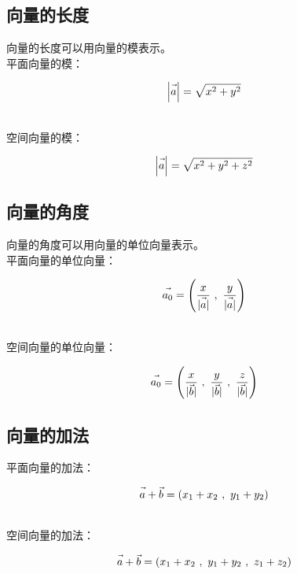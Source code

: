 \documentclass[UTF8]{ctexart}
\let\nvec\vec
\def\vec#1{\nvec{\vphantom b\smash{#1}}}
\begin{document}
\newpage

\subsection{向量的长度}
    向量的长度可以用向量的模表示。\\[3mm]
    平面向量的模：
    \begin{large}
        \begin{equation*}
            \left|\vec{a}\right|=\sqrt{x^2+y^2}    
        \end{equation*}
    \end{large}\\
    空间向量的模：
    \begin{large}
        \begin{equation*}
            \left|\vec{a}\right|=\sqrt{x^2+y^2+z^2}
        \end{equation*}
    \end{large}\vspace{-10pt}

\subsection{向量的角度}
    向量的角度可以用向量的单位向量表示。\\[3mm]
    平面向量的单位向量：
    \begin{large}
        \begin{equation*}
            \vec{a_0}=\left(\frac{x}{|\vec{a}|}~,~\frac{y}{|\vec{a}|}\right)
        \end{equation*}
    \end{large}\\
    空间向量的单位向量：
    \begin{large}
        \begin{equation*}
            \vec{a_0}=\left(\frac{x}{|\vec{b}|}~,~\frac{y}{|\vec{b}|}~,~\frac{z}{|\vec{b}|}\right)
        \end{equation*}
    \end{large}\vspace{-4pt}

\subsection{向量的加法}
    平面向量的加法：
    \begin{large}
        \begin{equation*}
            \vec{a}+\vec{b}=(x_1+x_2~,~y_1+y_2)
        \end{equation*}
    \end{large}\\
    空间向量的加法：
    \begin{large}
        \begin{equation*}
            \vec{a}+\vec{b}=(x_1+x_2~,~y_1+y_2~,~z_1+z_2)
        \end{equation*}
    \end{large}\vspace{-5pt}
\end{document}
